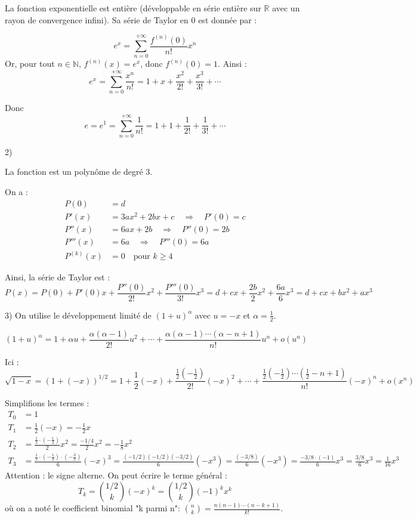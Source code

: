 La fonction exponentielle est entière (développable en série entière sur $\mathbb{R}$ avec un rayon de convergence infini). Sa série de Taylor en 0 est donnée par :

\[
e^x = \sum_{n=0}^{+\infty} \frac{f^{(n)}(0)}{n!} x^n
\]
Or, pour tout $n \in \mathbb{N}$, $f^{(n)}(x) = e^x$, donc $f^{(n)}(0) = 1$. Ainsi :
\[
e^x = \sum_{n=0}^{+\infty} \frac{x^n}{n!} = 1 + x + \frac{x^2}{2!} + \frac{x^3}{3!} + \cdots
\]

Donc 
\[
e = e^1 = \sum_{n=0}^{+\infty} \frac{1}{n!} = 1 + 1 + \frac{1}{2!} + \frac{1}{3!} + \cdots
\]

2)

La fonction est un polynôme de degré 3.

On a :
\begin{align*}
P(0) &= d \\
P'(x) &= 3a x^2 + 2b x + c \quad \Rightarrow \quad P'(0) = c \\
P''(x) &= 6a x + 2b \quad \Rightarrow \quad P''(0) = 2b \\
P'''(x) &= 6a \quad \Rightarrow \quad P'''(0) = 6a \\
P^{(k)}(x) &= 0 \quad \text{pour } k \geq 4
\end{align*}

Ainsi, la série de Taylor est :
\[
P(x) = P(0) + P'(0)x + \frac{P''(0)}{2!} x^2 + \frac{P'''(0)}{3!} x^3 = d + c x + \frac{2b}{2} x^2 + \frac{6a}{6} x^3 = d + c x + b x^2 + a x^3
\]

3)
On utilise le développement limité de $(1+u)^\alpha$ avec $u = -x$ et $\alpha = \frac{1}{2}$.

\[
(1+u)^\alpha = 1 + \alpha u + \frac{\alpha(\alpha-1)}{2!} u^2 + \cdots + \frac{\alpha(\alpha-1)\cdots(\alpha-n+1)}{n!} u^n + o(u^n)
\]

Ici :
\[
\sqrt{1-x} = (1 + (-x))^{1/2} = 1 + \frac{1}{2} (-x) + \frac{\frac{1}{2} \left(-\frac{1}{2}\right)}{2!} (-x)^2 + \cdots + \frac{\frac{1}{2} \left(-\frac{1}{2}\right) \cdots \left(\frac{1}{2} - n + 1\right)}{n!} (-x)^n + o(x^n)
\]

Simplifions les termes :
\begin{align*}
T_0 &= 1 \\
T_1 &= \frac{1}{2} (-x) = -\frac{1}{2} x \\
T_2 &= \frac{\frac{1}{2} \cdot \left(-\frac{1}{2}\right)}{2} x^2 = \frac{-1/4}{2} x^2 = -\frac{1}{8} x^2 \\
T_3 &= \frac{\frac{1}{2} \cdot \left(-\frac{1}{2}\right) \cdot \left(-\frac{3}{2}\right)}{6} (-x)^3 = \frac{(-1/2)(-1/2)(-3/2)}{6} (-x^3) = \frac{(-3/8)}{6} (-x^3) = \frac{-3/8 \cdot (-1)}{6} x^3 = \frac{3/8}{6} x^3 = \frac{1}{16} x^3
\end{align*}
Attention : le signe alterne. On peut écrire le terme général :
\[
T_k = \binom{1/2}{k} (-x)^k = \binom{1/2}{k} (-1)^k x^k
\]
où on a noté le coefficient binomial "k parmi n": $\binom{n}{k} = \frac{n(n-1)\cdots(n-k+1)}{k!}$.

